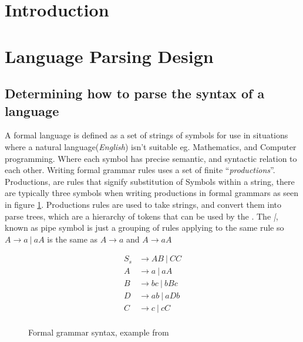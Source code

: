 
\section{Introduction}

\newpage
\section{Language Parsing Design}
\subsection{Determining how to parse the syntax of a language}
A formal language is defined as a set of strings of symbols for use in situations where a natural language(\textit{English}) isn't suitable eg. Mathematics, and Computer programming. Where each symbol has precise semantic, and syntactic relation to each other. Writing formal grammar rules uses a set of finite ``\textit{productions}''. Productions, are rules that signify substitution of Symbols within a string, there are typically three symbols when writing productions in formal grammars as seen in figure \ref{fig:formalGrammar}. Productions rules are used to take strings, and convert them into parse trees, which are a hierarchy of tokens that can be used by the \compiler{}. The \emph{|}, known as pipe symbol is just a grouping of rules applying to the same rule so $A \rightarrow a\ |\ aA$ is the same as $A \rightarrow a$ and $ A \rightarrow aA$

\begin{figure}[ht!]
    \begin{align*}
    S_s &\rightarrow AB\ |\ CC \\
    A &\rightarrow a\ |\ aA \\
    B &\rightarrow bc\ |\ bBc \\
    D &\rightarrow ab\ |\ aDb \\
    C &\rightarrow c\ |\ cC \\
    \end{align*}
    \caption{Formal grammar syntax, example from \cite{ParseTech}}
    \label{fig:formalGrammar}
\end{figure}
